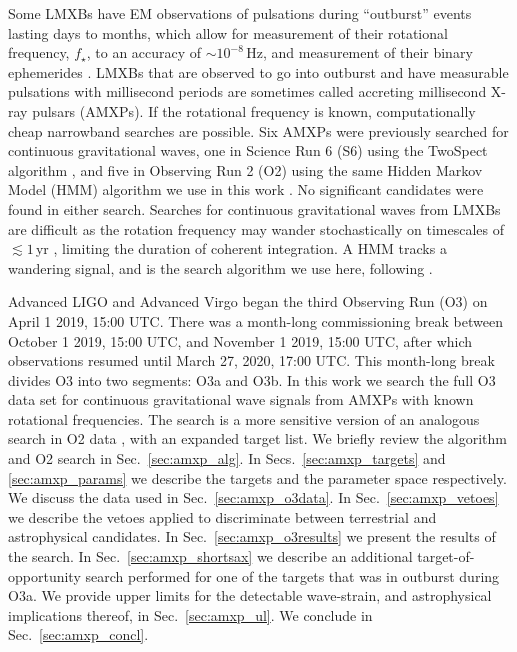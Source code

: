 Some LMXBs have EM observations of pulsations during ``outburst'' events lasting days to months, which allow for measurement of their rotational frequency, $f_\star$, to an accuracy of $\sim10^{-8}\,$Hz, and measurement of their binary ephemerides \cite{DiSalvo2022, Patruno2021}. LMXBs that are observed to go into outburst and have measurable pulsations with millisecond periods are sometimes called accreting millisecond X-ray pulsars (AMXPs). If the rotational frequency is known, computationally cheap narrowband searches are possible. Six AMXPs were previously searched for continuous gravitational waves, one in Science Run 6 (S6) using the TwoSpect algorithm \cite{twoSpectInit,s6twoSpectScoXTE}, and five in Observing Run 2 (O2) using the same Hidden Markov Model (HMM) algorithm we use in this work \cite{Suvorova2017,Middleton2020}. No significant candidates were found in either search. Searches for continuous gravitational waves from LMXBs are difficult as the rotation frequency may wander stochastically on timescales of $\lesssim 1\,$yr \cite{Mukherjee2018}, limiting the duration of coherent integration. A HMM tracks a wandering signal, and is the search algorithm we use here, following \citet{Suvorova2016,Suvorova2017,o2vitsco,Middleton2020}.

Advanced LIGO and Advanced Virgo began the third Observing Run (O3) on April 1 2019, 15:00 UTC. There was a month-long commissioning break between October 1 2019, 15:00 UTC, and November 1 2019, 15:00 UTC, after which observations resumed until March 27, 2020, 17:00 UTC. This month-long break divides O3 into two segments: O3a and O3b. In this work we search the full O3 data set for continuous gravitational wave signals from AMXPs with known rotational frequencies. The search is a more sensitive version of an analogous search in O2 data \cite{Middleton2020}, with an expanded target list. We briefly review the algorithm and O2 search in Sec.~\ref{sec:amxp_alg}. In Secs.~\ref{sec:amxp_targets} and \ref{sec:amxp_params} we describe the targets and the parameter space respectively. We discuss the data used in Sec.~\ref{sec:amxp_o3data}. In Sec.~\ref{sec:amxp_vetoes} we describe the vetoes applied to discriminate between terrestrial and astrophysical candidates. In Sec.~\ref{sec:amxp_o3results} we present the results of the search. In Sec.~\ref{sec:amxp_shortsax} we describe an additional target-of-opportunity search performed for one of the targets that was in outburst during O3a. We provide upper limits for the detectable wave-strain, and astrophysical implications thereof, in Sec.~\ref{sec:amxp_ul}. We conclude in Sec.~\ref{sec:amxp_concl}.

